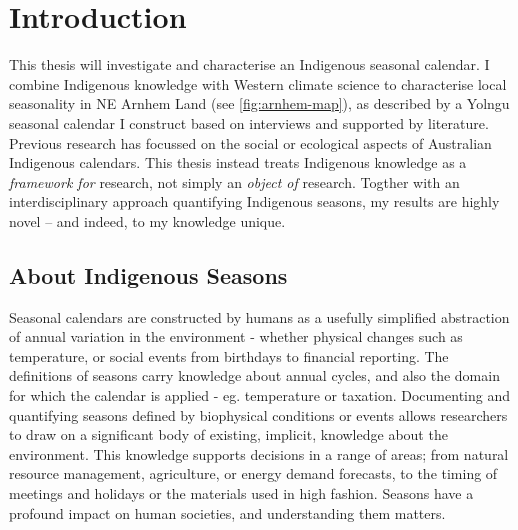 \chapter{Introduction}

This thesis will investigate and characterise an Indigenous seasonal calendar.
I combine Indigenous knowledge with Western climate science to characterise
local seasonality in NE Arnhem Land (see \autoref{fig:arnhem-map}),
as described by a Yolngu seasonal calendar I construct based on
interviews and supported by literature.\\

Previous research has focussed on the social or ecological aspects of Australian
Indigenous calendars.  This thesis instead treats Indigenous knowledge as a
\emph{framework for} research, not simply an \emph{object of} research.
Togther with an interdisciplinary approach quantifying Indigenous seasons,
my results are highly novel -- and indeed, to my knowledge unique.



\section{About Indigenous Seasons}

Seasonal calendars are constructed by humans as a usefully simplified
abstraction of annual variation in the environment - whether physical
changes such as temperature, or social events from birthdays to financial
reporting.  The definitions of seasons carry knowledge about annual cycles,
and also the domain for which the calendar is applied - eg. temperature
or taxation.
%
Documenting and quantifying seasons defined by biophysical conditions
or events allows researchers to draw on a significant body of existing,
implicit, knowledge about the environment.
%
This knowledge supports decisions in a range of areas; from natural
resource management, agriculture, or energy demand forecasts, to
the timing of meetings and holidays or the materials used in high fashion.
Seasons have a profound impact on human societies, and understanding
them matters.\\


